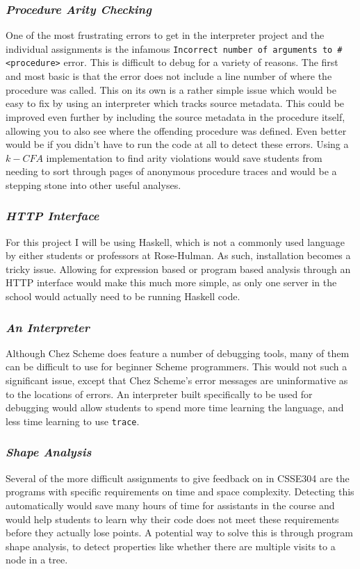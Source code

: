 \documentclass{article}
\begin{document}
\subsubsection*{\textit{Procedure Arity Checking}}
One of the most frustrating errors to get in the interpreter project and the
individual assignments is the infamous \texttt{Incorrect number of arguments to
  \#<procedure>} error. This is difficult to debug for a variety of reasons. The
first and most basic is that the error does not include a line number of where
the procedure was called. This on its own is a rather simple issue which would
be easy to fix by using an interpreter which tracks source metadata. This could
be improved even further by including the source metadata in the procedure
itself, allowing you to also see where the offending procedure was defined. Even
better would be if you didn't have to run the code at all to detect these errors.
Using a $k-CFA$ implementation to find arity violations would save students from
needing to sort through pages of anonymous procedure traces and would be a
stepping stone into other useful analyses.

\subsubsection*{\textit{HTTP Interface}}
For this project I will be using Haskell, which is not a commonly used language
by either students or professors at Rose-Hulman. As such, installation becomes a
tricky issue. Allowing for expression based or program based analysis through an
HTTP interface would make this much more simple, as only one server in the
school would actually need to be running Haskell code.

\subsubsection*{\textit{An Interpreter}}
Although Chez Scheme does feature a number of debugging tools, many of them can
be difficult to use for beginner Scheme programmers. This would not such a
significant issue, except that Chez Scheme's error messages are uninformative as
to the locations of errors. An interpreter built specifically to be used for
debugging would allow students to spend more time learning the language, and
less time learning to use \texttt{trace}.

\subsubsection*{\textit{Shape Analysis}}
Several of the more difficult assignments to give feedback on in CSSE304 are the
programs with specific requirements on time and space complexity. Detecting this
automatically would save many hours of time for assistants in the course and
would help students to learn why their code does not meet these requirements
before they actually lose points. A potential way to solve this is through
program shape analysis, to detect properties like whether there are multiple
visits to a node in a tree.
\end{document}

